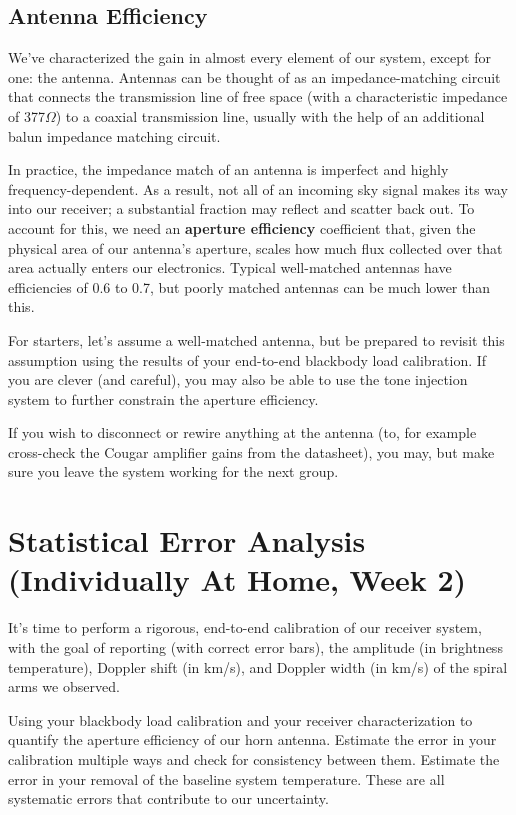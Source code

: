 \documentclass[11pt,preprint]{aastex}
\begin{document}
\subsection{Antenna Efficiency}

We've characterized the gain in almost every element of our system, except
for one: the antenna. Antennas can be thought of as an impedance-matching
circuit that connects the transmission line of free space (with a characteristic
impedance of 377$\Omega$) to a coaxial transmission line, usually with the
help of an additional balun impedance matching circuit.

In practice, the impedance match of an antenna is imperfect and highly 
frequency-dependent. As a result, not all of an incoming sky signal makes its
way into our receiver; a substantial fraction may reflect and scatter back
out. To account for this, we need an {\bf aperture efficiency}
coefficient that, given the physical area of our antenna's aperture, 
scales how much flux collected over that area actually enters our electronics.
Typical well-matched antennas have efficiencies of 0.6 to 0.7, but poorly matched
antennas can be much lower than this.

For starters, let's assume a well-matched antenna, but be prepared
to revisit this assumption using the results of your end-to-end blackbody load
calibration. If you are clever (and careful), you may also be able to use
the tone injection system to further constrain the aperture efficiency.

If you wish to disconnect or rewire anything at the antenna (to, for example
cross-check the Cougar amplifier gains from the datasheet), you may, but make
sure you leave the system working for the next group.

\section {Statistical Error Analysis (Individually At Home, Week 2)} \label{secondweek}
 
It's time to perform a rigorous, end-to-end calibration of our receiver system,
with the goal of reporting (with correct error bars), the amplitude (in
brightness temperature), Doppler shift (in km/s), and Doppler width (in km/s)
of the spiral arms we observed.

Using your blackbody load calibration and your receiver characterization
to quantify the aperture efficiency of our horn antenna. Estimate the error
in your calibration multiple ways and check for consistency between them.
Estimate the error in your removal of the baseline system temperature.
These are all systematic errors that contribute to our uncertainty.
\end{document}
